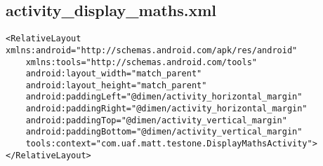\subsection{activity\_display\_maths.xml}
\label{app:camathsxml}
\begin{lstlisting}
<RelativeLayout xmlns:android="http://schemas.android.com/apk/res/android"
    xmlns:tools="http://schemas.android.com/tools"
    android:layout_width="match_parent"
    android:layout_height="match_parent"
    android:paddingLeft="@dimen/activity_horizontal_margin"
    android:paddingRight="@dimen/activity_horizontal_margin"
    android:paddingTop="@dimen/activity_vertical_margin"
    android:paddingBottom="@dimen/activity_vertical_margin"
    tools:context="com.uaf.matt.testone.DisplayMathsActivity">
</RelativeLayout>
\end{lstlisting}
